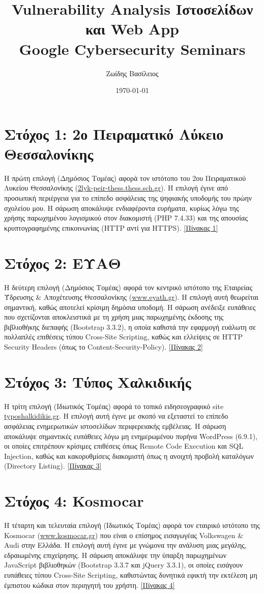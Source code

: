 \documentclass[12pt, a4paper]{article}
\title{Vulnerability Analysis Ιστοσελίδων και Web App\\[1ex] \large Google Cybersecurity Seminars}
\author{Ζωίδης Βασίλειος}
\date{\today}
\begin{document}
\maketitle

\section*{Στόχος 1: 2ο Πειραματικό Λύκειο Θεσσαλονίκης}
Η πρώτη επιλογή (Δημόσιος Τομέας) αφορά τον ιστότοπο του 2ου Πειραματικού Λυκείου Θεσσαλονίκης (\href{http://2lyk-peir-thess.thess.sch.gr/}{2lyk-peir-thess.thess.sch.gr}). Η επιλογή έγινε από προσωπική περιέργεια για το επίπεδο ασφάλειας της ψηφιακής υποδομής του πρώην σχολείου μου. Η σάρωση αποκάλυψε ενδιαφέροντα ευρήματα, κυρίως λόγω της χρήσης παρωχημένου λογισμικού στον διακομιστή (PHP 7.4.33) και της απουσίας κρυπτογραφημένης επικοινωνίας (HTTP αντί για HTTPS). \hyperref[tab:1]{[Πίνακας 1]}

\section*{Στόχος 2: ΕΥΑΘ}
Η δεύτερη επιλογή (Δημόσιος Τομέας) αφορά τον κεντρικό ιστότοπο της Εταιρείας Ύδρευσης \& Αποχέτευσης Θεσσαλονίκης (\href{https://www.eyath.gr/}{www.eyath.gr}). Η επιλογή αυτή θεωρείται σημαντική, καθώς αποτελεί κρίσιμη δημόσια υποδομή. Η σάρωση ανέδειξε ευπάθειες που σχετίζονται αποκλειστικά με τη χρήση μιας παρωχημένης έκδοσης της βιβλιοθήκης διεπαφής (Bootstrap 3.3.2), η οποία καθιστά την εφαρμογή ευάλωτη σε πολλαπλές επιθέσεις τύπου Cross-Site Scripting, καθώς και ελλείψεις σε HTTP Security Headers (όπως το Content-Security-Policy).
\hyperref[tab:2]{[Πίνακας 2]}

\section*{Στόχος 3: Τύπος Χαλκιδικής}
Η τρίτη επιλογή (Ιδιωτικός Τομέας) αφορά το τοπικό ειδησεογραφικό site \href{https://typoshalkidikis.gr/}{typoshalkidikis.gr}. Η επιλογή αυτή έγινε με σκοπό να εξεταστεί το επίπεδο ασφάλειας ενημερωτικών ιστοσελίδων περιφερειακής εμβέλειας. Η σάρωση αποκάλυψε σημαντικές ευπάθειες λόγω μη ενημερωμένου πυρήνα WordPress (6.9.1), οι οποίες επιτρέπουν κρίσιμες επιθέσεις όπως Remote Code Execution και SQL Injection, καθώς και κακορυθμίσεις διακομιστή όπως η ανοιχτή προβολή καταλόγων (Directory Listing).
\hyperref[tab:3]{[Πίνακας 3]}

\section*{Στόχος 4: Kosmocar}
Η τέταρτη και τελευταία επιλογή (Ιδιωτικός Τομέας) αφορά τον εταιρικό ιστότοπο της Kosmocar (\href{https://www.kosmocar.gr/}{www.kosmocar.gr}) που είναι ο επίσημος εισαγωγέας Volkswagen \& Audi στην Ελλάδα. Η επιλογή αυτή έγινε με γνώμονα την ανάλυση μιας μεγάλης, εδραιωμένης επιχείρησης. Η σάρωση αποκάλυψε την ύπαρξη παρωχημένων JavaScript βιβλιοθηκών (Bootstrap 3.3.7 και jQuery 3.3.1), οι οποίες εισάγουν ευπάθειες τύπου Cross-Site Scripting, καθιστώντας δυνητικά εφικτή την εκτέλεση μη έμπιστου κώδικα στον περιηγητή του χρήστη.
\hyperref[tab:4]{[Πίνακας 4]}
\end{document}
